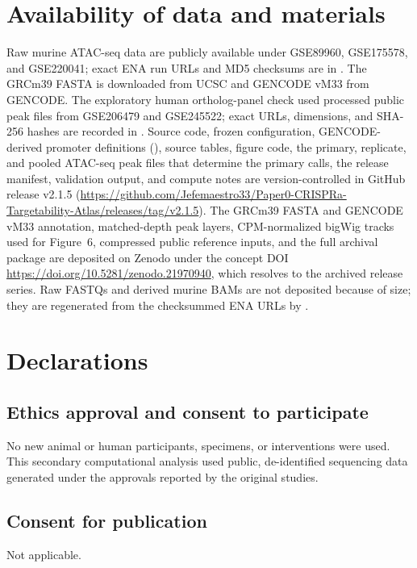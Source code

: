 \documentclass[11pt]{article}
\begin{document}
\section{Availability of data and materials}

Raw murine ATAC-seq data are publicly available under GSE89960, GSE175578, and GSE220041; exact ENA run URLs and MD5 checksums are in . The GRCm39 FASTA is downloaded from UCSC and GENCODE vM33 from GENCODE. The exploratory human ortholog-panel check used processed public peak files from GSE206479 and GSE245522; exact URLs, dimensions, and SHA-256 hashes are recorded in . Source code, frozen configuration, GENCODE-derived promoter definitions (), source tables, figure code, the primary, replicate, and pooled ATAC-seq peak files that determine the primary calls, the release manifest, validation output, and compute notes are version-controlled in GitHub release v2.1.5 (\url{https://github.com/Jefemaestro33/Paper0-CRISPRa-Targetability-Atlas/releases/tag/v2.1.5}). The GRCm39 FASTA and GENCODE vM33 annotation, matched-depth peak layers, CPM-normalized bigWig tracks used for Figure~6, compressed public reference inputs, and the full archival package are deposited on Zenodo under the concept DOI \url{https://doi.org/10.5281/zenodo.21970940}, which resolves to the archived release series. Raw FASTQs and derived murine BAMs are not deposited because of size; they are regenerated from the checksummed ENA URLs by .

\section*{Declarations}

\subsection*{Ethics approval and consent to participate}
No new animal or human participants, specimens, or interventions were used. This secondary computational analysis used public, de-identified sequencing data generated under the approvals reported by the original studies.

\subsection*{Consent for publication}
Not applicable.
\end{document}
